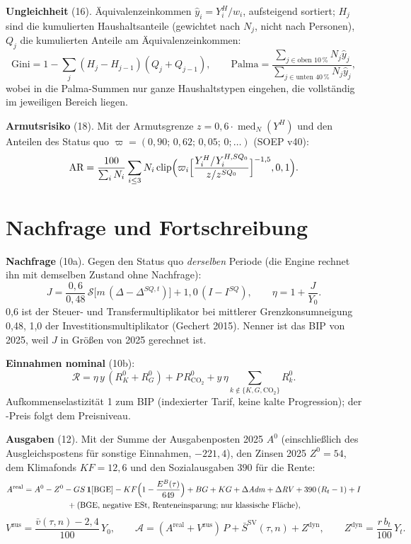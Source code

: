 \textbf{Ungleichheit} (16). Äquivalenzeinkommen $\hat y_i=Y^H_i/w_i$, aufsteigend sortiert;
$H_j$ sind die kumulierten Haushaltsanteile (gewichtet nach $N_j$, nicht nach Personen),
$Q_j$ die kumulierten Anteile am Äquivalenzeinkommen:
\begin{equation}
\text{Gini}=1-\sum_j (H_j-H_{j-1})(Q_j+Q_{j-1}),\qquad
\text{Palma}=\frac{\sum_{j\in\text{oben }10\,\%}N_j\hat y_j}{\sum_{j\in\text{unten }40\,\%}N_j\hat y_j},
\end{equation}
wobei in die Palma-Summen nur ganze Haushaltstypen eingehen, die vollständig im jeweiligen
Bereich liegen.

\textbf{Armutsrisiko} (18). Mit der Armutsgrenze $z=0{,}6\cdot\operatorname{med}_N(Y^H)$ und den
Anteilen des Status quo $\varpi=(0{,}90;\,0{,}62;\,0{,}05;\,0;\dots)$ (SOEP v40):
\begin{equation}
\text{AR}=\frac{100}{\sum_iN_i}\sum_{i\le3}N_i\operatorname{clip}\Bigl(\varpi_i\Bigl[\frac{Y^H_i/Y^{H,SQ_0}_i}{z/z^{SQ_0}}\Bigr]^{-1{,}5},0,1\Bigr).
\end{equation}

\section{Nachfrage und Fortschreibung}

\textbf{Nachfrage} (10a). Gegen den Status quo \emph{derselben} Periode (die Engine rechnet
ihn mit demselben Zustand ohne Nachfrage):
\begin{equation}
J=\frac{0{,}6}{0{,}48}\,\mathcal S\bigl[m\,(\Delta-\Delta^{SQ,t})\bigr]+1{,}0\,(I-I^{SQ}),\qquad
\eta=1+\frac{J}{Y_0}.
\end{equation}
0,6 ist der Steuer- und Transfermultiplikator bei mittlerer Grenzkonsumneigung 0,48, 1,0 der
Investitionsmultiplikator (Gechert 2015). Nenner ist das BIP von 2025, weil $J$ in Größen
von 2025 gerechnet ist.

\textbf{Einnahmen nominal} (10b):
\begin{equation}
\mathcal R=\eta\,y\,(R^0_K+R^0_G)+P\,R^0_{\text{CO}_2}+y\,\eta\!\!\sum_{k\notin\{K,G,\text{CO}_2\}}\!\!R^0_k.
\end{equation}
Aufkommenselastizität 1 zum BIP (indexierter Tarif, keine kalte Progression); der
\COz-Preis folgt dem Preisniveau.

\textbf{Ausgaben} (12). Mit der Summe der Ausgabenposten 2025 $A^0$ (einschließlich des
Ausgleichspostens für sonstige Einnahmen, $-221{,}4$), den Zinsen 2025 $Z^0=54$, dem
Klimafonds $KF=12{,}6$ und den Sozialausgaben $390$ für die Rente:
\begin{multline}
A^{\text{real}}=A^0-Z^0-GS\,\mathbf 1[\text{BGE}]-KF\Bigl(1-\frac{E^B(\tau)}{649}\Bigr)
+BG+KG+\Delta\mathit{Adm}+\Delta\mathit{RV}+390\,(R_t-1)+I\\
{}+(\text{BGE, negative ESt, Renteneinsparung; nur klassische Fläche}),
\end{multline}
\begin{equation}
V^{\text{zus}}=\frac{\bar v(\tau,n)-2{,}4}{100}\,Y_0,\qquad
\mathcal A=(A^{\text{real}}+V^{\text{zus}})\,P+\bar S^{\text{SV}}(\tau,n)+Z^{\text{dyn}},\qquad
Z^{\text{dyn}}=\frac{r\,b_t}{100}\,Y_t.
\end{equation}

